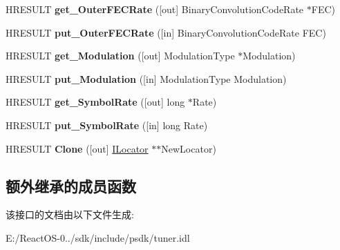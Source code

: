 \begin{DoxyCompactItemize}
\mbox{\label{interface_i_locator_ac2eb60fa193c6acb335221aca2758ad8}} 
H\+R\+E\+S\+U\+LT {\bfseries get\+\_\+\+Outer\+F\+E\+C\+Rate} (\mbox{[}out\mbox{]} Binary\+Convolution\+Code\+Rate $\ast$F\+EC)
\item 
\mbox{\label{interface_i_locator_acd44f033be0e6b5700afafe946aec72a}} 
H\+R\+E\+S\+U\+LT {\bfseries put\+\_\+\+Outer\+F\+E\+C\+Rate} (\mbox{[}in\mbox{]} Binary\+Convolution\+Code\+Rate F\+EC)
\item 
\mbox{\label{interface_i_locator_a22286299c05204e72fd04ad929033e16}} 
H\+R\+E\+S\+U\+LT {\bfseries get\+\_\+\+Modulation} (\mbox{[}out\mbox{]} Modulation\+Type $\ast$Modulation)
\item 
\mbox{\label{interface_i_locator_a37887605ee6edecdd16138a657df68f4}} 
H\+R\+E\+S\+U\+LT {\bfseries put\+\_\+\+Modulation} (\mbox{[}in\mbox{]} Modulation\+Type Modulation)
\item 
\mbox{\label{interface_i_locator_aa1e6bc160421c1961573149e1c690530}} 
H\+R\+E\+S\+U\+LT {\bfseries get\+\_\+\+Symbol\+Rate} (\mbox{[}out\mbox{]} long $\ast$Rate)
\item 
\mbox{\label{interface_i_locator_a3616f3c1b6f8e4c33c1d0c84bc58cd2e}} 
H\+R\+E\+S\+U\+LT {\bfseries put\+\_\+\+Symbol\+Rate} (\mbox{[}in\mbox{]} long Rate)
\item 
\mbox{\label{interface_i_locator_a0c573573fa17e5d9241f6d59a218497b}} 
H\+R\+E\+S\+U\+LT {\bfseries Clone} (\mbox{[}out\mbox{]} \hyperlink{interface_i_locator}{I\+Locator} $\ast$$\ast$New\+Locator)
\end{DoxyCompactItemize}
\subsection*{额外继承的成员函数}


该接口的文档由以下文件生成\+:\begin{DoxyCompactItemize}
\item 
E\+:/\+React\+O\+S-\/0../sdk/include/psdk/tuner.\+idl\end{DoxyCompactItemize}
